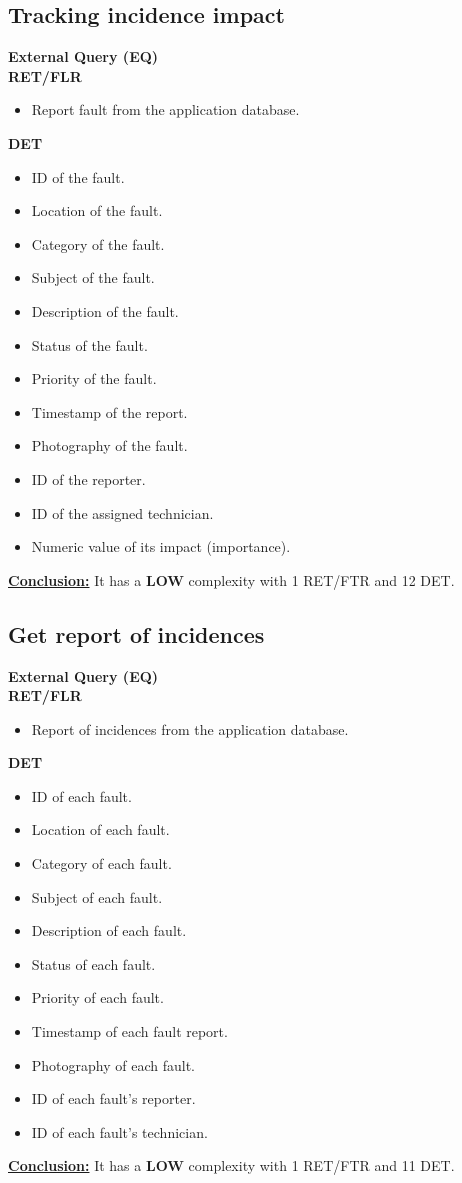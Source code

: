 \subsection{Tracking incidence impact}
\textbf{External Query (EQ)} \\ 
\textbf{RET/FLR}
\begin{itemize}
\item Report fault from the application database.
\end{itemize}
\textbf{DET}
\begin{itemize}
\item ID of the fault.
\item Location of the fault.
\item Category of the fault.
\item Subject of the fault.
\item Description of the fault.
\item Status of the fault.
\item Priority of the fault.
\item Timestamp of the report.
\item Photography of the fault.
\item ID of the reporter.
\item ID of the assigned technician.
\item Numeric value of its impact (importance).
\end{itemize}
\textbf{\underline{Conclusion:}} It has a \textbf{LOW} complexity with 1 RET/FTR and 12 DET.

\subsection{Get report of incidences}
\textbf{External Query (EQ)} \\ 
\textbf{RET/FLR}
\begin{itemize}
\item Report of incidences from the application database.
\end{itemize}
\textbf{DET}
\begin{itemize}
\item ID of each fault.
\item Location of each fault.
\item Category of each fault.
\item Subject of each fault.
\item Description of each fault.
\item Status of each fault.
\item Priority of each fault.
\item Timestamp of each fault report.
\item Photography of each fault.
\item ID of each fault's reporter.
\item ID of each fault's technician.
\end{itemize}
\textbf{\underline{Conclusion:}} It has a \textbf{LOW} complexity with 1 RET/FTR and 11 DET.

